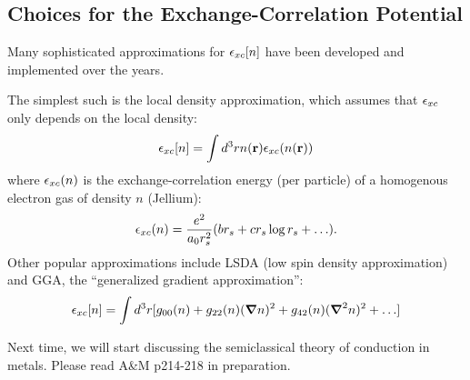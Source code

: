 \subsection{Choices for the Exchange-Correlation Potential}
Many sophisticated approximations for $\epsilon_{xc}[n]$ have been developed and implemented over the years. 

The simplest such is the local density approximation, which assumes that $\epsilon_{xc}$ only depends on the local density:
\begin{equation}
    \epsilon_{xc}[n] = \int d^3r n(\mathbf{r})\epsilon_{xc}(n(\mathbf{r}))
\end{equation}
where $\epsilon_{xc}(n)$ is the exchange-correlation energy (per particle) of a homogenous electron gas of density $n$ (Jellium):
\begin{equation}
    \epsilon_{xc}(n) = \frac{e^2}{a_0r_s^2}(br_s + cr_s\log r_s + \ldots).
\end{equation}
Other popular approximations include LSDA (low spin density approximation) and GGA, the ``generalized gradient approximation'':
\begin{equation}
    \e_{xc}[n] = \int d^3r[g_{00}(n) + g_{22}(n)(\nabla n)^2 + g_{42}(n)(\nabla^2 n)^2 + \ldots]
\end{equation}

Next time, we will start discussing the semiclassical theory of conduction in metals. Please read A\&M p214-218 in preparation.